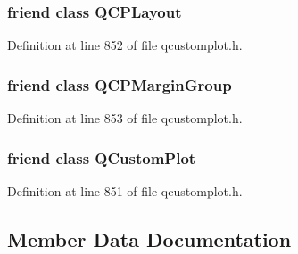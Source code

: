\subsubsection[{Q\+C\+P\+Layout}]{\setlength{\rightskip}{0pt plus 5cm}friend class {\bf Q\+C\+P\+Layout}\hspace{0.3cm}{\ttfamily [friend]}}\label{class_q_c_p_layout_element_a588aac0a0d721f6c5f10126d8596a20f}


Definition at line 852 of file qcustomplot.\+h.

\hypertarget{class_q_c_p_layout_element_ad077a686e85ab6fa03dcb2fd37fc499a}{}
\subsubsection[{Q\+C\+P\+Margin\+Group}]{\setlength{\rightskip}{0pt plus 5cm}friend class {\bf Q\+C\+P\+Margin\+Group}\hspace{0.3cm}{\ttfamily [friend]}}\label{class_q_c_p_layout_element_ad077a686e85ab6fa03dcb2fd37fc499a}


Definition at line 853 of file qcustomplot.\+h.

\hypertarget{class_q_c_p_layout_element_a1cdf9df76adcfae45261690aa0ca2198}{}
\subsubsection[{Q\+Custom\+Plot}]{\setlength{\rightskip}{0pt plus 5cm}friend class {\bf Q\+Custom\+Plot}\hspace{0.3cm}{\ttfamily [friend]}}\label{class_q_c_p_layout_element_a1cdf9df76adcfae45261690aa0ca2198}


Definition at line 851 of file qcustomplot.\+h.



\subsection{Member Data Documentation}
\hypertarget{class_q_c_p_layout_element_af61c70354d1275778d68206b2a1b2d36}{}

